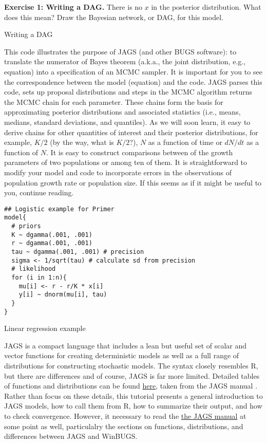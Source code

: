 \documentclass[12pt,english]{article}
\begin{document}
\bigskip
\belowcaptionskip=-40pt
\begin{exercise}
\begin{mdframed}
\doublespacing
\textbf{Exercise 1: Writing a DAG.} There is no $x$ in the posterior distribution. What does this mean? Draw the Bayesian network, or DAG, for this model.
\end{mdframed}
\captionsetup{textformat=empty, labelformat=empty}
\caption{Writing a DAG}
\label{ex:DAG}
\end{exercise}
\belowcaptionskip=0pt

This code illustrates the purpose of JAGS (and other BUGS software): to translate the numerator of Bayes theorem (a.k.a., the joint distribution, e.g., equation) into a specification of an MCMC sampler. It is important for you to see the correspondence between the model (equation) and the code. JAGS parses this code, sets up proposal distributions and steps in the MCMC algorithm returns the MCMC chain for each parameter. These chains form the basis for approximating posterior distributions and associated statistics (i.e., means, medians, standard deviations, and quantiles). As we will soon learn, it easy to derive chains for other quantities of interest and their posterior distributions, for example, $K/2$ (by the way, what is $K/2$?), $N$ as a function of time or $dN/dt$ as a function of $N$. It is easy to construct comparisons between of the growth parameters of two populations or among ten of them. It is straightforward to modify your model and code to incorporate errors in the observations of population growth rate or population size. If this seems as if it might be useful to you, continue reading. 

\begin{algorithm}
\begin{Verbatim}[frame=single]
## Logistic example for Primer
model{
  # priors
  K ~ dgamma(.001, .001)
  r ~ dgamma(.001, .001)
  tau ~ dgamma(.001, .001) # precision
  sigma <- 1/sqrt(tau) # calculate sd from precision
  # likelihood
  for (i in 1:n){
    mu[i] <- r - r/K * x[i]
    y[i] ~ dnorm(mu[i], tau)
  }
}
\end{Verbatim}
\caption{Linear regression example}
\label{alg:Linear regression example}
\end{algorithm}

JAGS is a compact language that includes a lean but useful set of scalar and vector functions for creating deterministic models as well as a full range of distributions for constructing stochastic models. The syntax closely resembles R, but there are differences and of course, JAGS is far more limited. Detailed tables of functions and distributions can be found \href{JAGSUserManualPages.pdf}{here}, taken from the JAGS manual \citep{Plummer_mannual}. Rather than focus on these details, this tutorial presents a general introduction to JAGS models, how to call them from R, how to summarize their output, and how to check convergence. However, it necessary to read the \href{https://sourceforge.net/projects/mcmc-jags/files/Manuals/4.x/}{the JAGS manual} at some point as well, particulalry the sections on functions, distributions, and differences between JAGS and WinBUGS.
\end{document}
